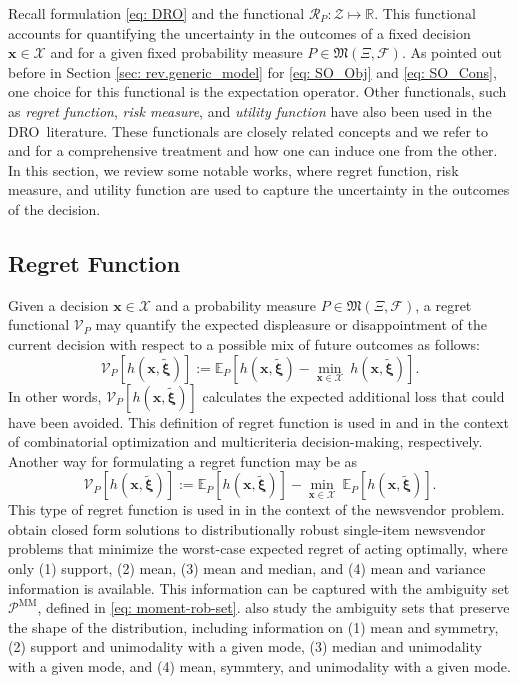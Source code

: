 \documentclass[final,onefignum,onetabnum]{class}
\newcommand{\ee}[2]{\mathbb{E}_{#1} \left[ #2 \right]}
\newcommand{\rregret}[2]{\Cs{V}_{#1} \left[ #2 \right]}
\newcommand{\bs}[1]{\boldsymbol{#1}} %
\newcommand{\Bs}[1]{\mathbb{#1}} %
\newcommand{\Cs}[1]{\mathcal{#1}} %
\newcommand{\Fs}[1]{\mathfrak{#1}} %
\newcommand{\txi}{\tilde{\bs{\xi}}}
\newcommand{\measurespace}{\left( \Xi, \Cs{F} \right)}
\newcommand{\dro}{DRO}
\begin{document}
Recall formulation \eqref{eq: DRO} and the functional $\Cs{R}_{P}: \Cs{Z} \mapsto \Bs{R}$. This functional accounts for quantifying the uncertainty in the outcomes of a fixed decision $\bs{x} \in \Cs{X}$ and  for a given fixed probability measure $P \in \Fs{M}\measurespace$. 
As pointed out before in Section \ref{sec: rev.generic_model} for \eqref{eq: SO_Obj} and \eqref{eq: SO_Cons}, one choice for this  functional is the expectation operator. Other functionals,  such as {\it regret function}, {\it risk measure}, and {\it utility function} have also been used in the \dro\ literature.
These functionals are closely related concepts and we refer to \citet{bental2007OCE} and \cite{rockafellar2015} for a comprehensive treatment and how one can induce one from the other. 
In this section, we review some notable works, where regret function, risk measure, and utility function are used to capture the uncertainty in the outcomes of the decision. 

\subsection{Regret Function}
\label{sec: rev.regret}

Given a decision $\bs{x} \in \Cs{X}$ and a probability measure $P \in \Fs{M}\measurespace$, a regret functional $\Cs{V}_{P}$ may quantify the expected displeasure or disappointment of the current decision with respect to a possible mix of future outcomes as follows: 
$$\rregret{P}{h(\bs{x},\txi)}:= \ee{P}{h(\bs{x}, \txi)- \min_{\bs{x} \in \Cs{X}} \  h(\bs{x}, \txi)}. $$
In other words, $\rregret{P}{h(\bs{x},\txi)}$  calculates the expected additional loss that could have been avoided. This definition of regret function is used in \citet{natarajan2014} and \citet{hu2011budget} in the context of combinatorial optimization and multicriteria decision-making, respectively. 
Another way for formulating a regret function may be as 
$$\rregret{P}{h(\bs{x},\txi)}:= \ee{P}{h(\bs{x}, \txi)}- \min_{\bs{x} \in \Cs{X}} \  \ee{P}{h(\bs{x}, \txi)}. $$
This type of regret function is used in \citet{perakis2008regret} in the context of the newsvendor problem. \citet{perakis2008regret} obtain closed form solutions to distributionally robust single-item newsvendor problems that minimize the worst-case expected regret of acting optimally, where only (1) support, (2) mean,  (3) mean and median, and (4) mean and variance information is available.  This  information can be captured with the ambiguity set $\Cs{P}^{\text{MM}}$, defined in \eqref{eq: moment-rob-set}. 
\citet{perakis2008regret} also study the ambiguity sets that preserve the shape of the distribution, including information on  (1) mean and symmetry, (2) support and unimodality with a given mode,  (3) median and unimodality with a given mode, and (4) mean, symmtery, and unimodality with a given mode. 
\end{document}
